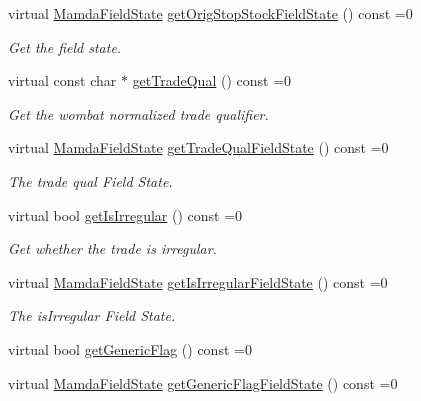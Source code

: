 \begin{CompactItemize}
virtual \hyperlink{namespaceWombat_93aac974f2ab713554fd12a1fa3b7d2a}{Mamda\-Field\-State} \hyperlink{classWombat_1_1MamdaTradeCancelOrError_79f84c7ff2fee996c7cb5e6472dbe471}{get\-Orig\-Stop\-Stock\-Field\-State} () const =0
\begin{CompactList}\small\item\em Get the field state. \item\end{CompactList}\item 
virtual const char $\ast$ \hyperlink{classWombat_1_1MamdaTradeCancelOrError_8eb9d5cce72be475cf039ec16aac3b3a}{get\-Trade\-Qual} () const =0
\begin{CompactList}\small\item\em Get the wombat normalized trade qualifier. \item\end{CompactList}\item 
virtual \hyperlink{namespaceWombat_93aac974f2ab713554fd12a1fa3b7d2a}{Mamda\-Field\-State} \hyperlink{classWombat_1_1MamdaTradeCancelOrError_db80e8a70132f714c2d351adac821cf7}{get\-Trade\-Qual\-Field\-State} () const =0
\begin{CompactList}\small\item\em The trade qual Field State. \item\end{CompactList}\item 
virtual bool \hyperlink{classWombat_1_1MamdaTradeCancelOrError_a066daf6f361384f809a91dd4085149e}{get\-Is\-Irregular} () const =0
\begin{CompactList}\small\item\em Get whether the trade is irregular. \item\end{CompactList}\item 
virtual \hyperlink{namespaceWombat_93aac974f2ab713554fd12a1fa3b7d2a}{Mamda\-Field\-State} \hyperlink{classWombat_1_1MamdaTradeCancelOrError_f44398c02c719db7a0f706a177590297}{get\-Is\-Irregular\-Field\-State} () const =0
\begin{CompactList}\small\item\em The is\-Irregular Field State. \item\end{CompactList}\item 
virtual bool \hyperlink{classWombat_1_1MamdaTradeCancelOrError_5ce3c13612b7670f2517b21d4541c39e}{get\-Generic\-Flag} () const =0
\item 
virtual \hyperlink{namespaceWombat_93aac974f2ab713554fd12a1fa3b7d2a}{Mamda\-Field\-State} \hyperlink{classWombat_1_1MamdaTradeCancelOrError_dcb98107626628f22341cccc440b54e0}{get\-Generic\-Flag\-Field\-State} () const =0

\end{CompactItemize}
